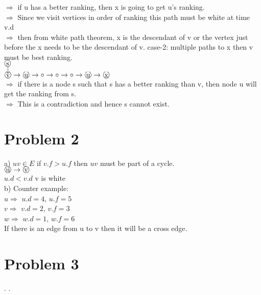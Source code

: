 \documentclass{article}
\begin{document}
$\Rightarrow$ if u has a better ranking, then x is going to get u's ranking.\\
$\Rightarrow$ Since we visit vertices in order of ranking this path must be white at time v.d \\
$\Rightarrow$ then from white path theorem, x is the descendant of v or the vertex just before the x needs to be the descendant of v. \newpage
\noindent case-2: multiple paths to x then v must be best ranking.\\
\indent \indent $\raisebox{.5pt}{\textcircled{\raisebox{-.9pt} {s}}}$\\
\indent \indent$\downarrow$ \\
$\raisebox{.5pt}{\textcircled{\raisebox{-.9pt} {v}}}\rightarrow \raisebox{.5pt}{\textcircled{\raisebox{-.9pt} {u}}} \rightarrow\circ \rightarrow \circ \rightarrow \circ \rightarrow  \raisebox{.5pt}{\textcircled{\raisebox{-.9pt} {u}}} \rightarrow \raisebox{.5pt}{\textcircled{\raisebox{-.9pt} {x}}}$\\
$\Rightarrow$ if there is a node s such that s has a better ranking than v, then node u will get the ranking from s.\\
$\Rightarrow$ This is a contradiction and hence s cannot exist.
\section{Problem 2}
a) $uv\in E$ if $v.f>u.f$ then $uv$ must be part of a cycle. \\
$\raisebox{.5pt}{\textcircled{\raisebox{-.9pt} {u}}} \rightarrow \raisebox{.5pt}{\textcircled{\raisebox{-.9pt} {v}}}$\\
$u.d<v.d$ v is white \\
b) Counter example: \\
$u\Rightarrow$ $u.d = 4$, $u.f = 5$\\
$v\Rightarrow$ $v.d = 2$, $v.f = 3$\\
$w\Rightarrow$ $w.d = 1$, $w.f = 6$\\
If there is an edge from u to v then it will be a cross edge.\\
\section{Problem 3}
.\hrulefill
\newline
.\hrulefill
\newpage
\end{document}

